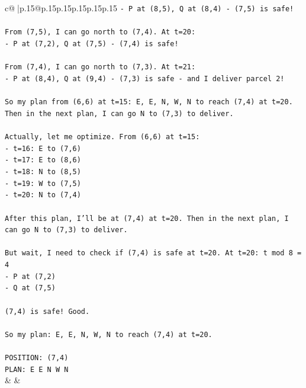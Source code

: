 \documentclass{article}
\begin{document}
{\begin{supertabular}{c@{$\;$}|p{.15\linewidth}@{}p{.15\linewidth}p{.15\linewidth}p{.15\linewidth}p{.15\linewidth}p{.15\linewidth}}
{{{\texttt{{-} P at (8,5), Q at (8,4) {-} (7,5) is safe!} \\
\\ 
\texttt{From (7,5), I can go north to (7,4). At t=20:} \\
\texttt{{-} P at (7,2), Q at (7,5) {-} (7,4) is safe!} \\
\\ 
\texttt{From (7,4), I can go north to (7,3). At t=21:} \\
\texttt{{-} P at (8,4), Q at (9,4) {-} (7,3) is safe {-} and I deliver parcel 2!} \\
\\ 
\texttt{So my plan from (6,6) at t=15: E, E, N, W, N to reach (7,4) at t=20. Then in the next plan, I can go N to (7,3) to deliver.} \\
\\ 
\texttt{Actually, let me optimize. From (6,6) at t=15:} \\
\texttt{{-} t=16: E to (7,6)} \\
\texttt{{-} t=17: E to (8,6)} \\
\texttt{{-} t=18: N to (8,5)} \\
\texttt{{-} t=19: W to (7,5)} \\
\texttt{{-} t=20: N to (7,4)} \\
\\ 
\texttt{After this plan, I'll be at (7,4) at t=20. Then in the next plan, I can go N to (7,3) to deliver.} \\
\\ 
\texttt{But wait, I need to check if (7,4) is safe at t=20. At t=20: t mod 8 = 4} \\
\texttt{{-} P at (7,2)} \\
\texttt{{-} Q at (7,5)} \\
\\ 
\texttt{(7,4) is safe! Good.} \\
\\ 
\texttt{So my plan: E, E, N, W, N to reach (7,4) at t=20.} \\
\\ 
\texttt{POSITION: (7,4)} \\
\texttt{PLAN: E E N W N} \\
            }
        }
    }
    & & \\ \\


\end{supertabular}}
\end{document}
